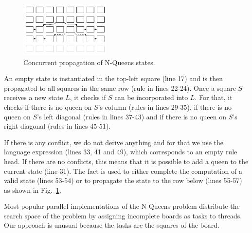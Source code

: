 \begin{figure}[ht]
\includegraphics[width=0.4\textwidth]{figures/coordination/nqueens.pdf}
\caption{Concurrent propagation of N-Queens states.}
\label{coordination:fig:nqueens}
\end{figure}

An empty state is instantiated in the top-left square (line 17) and is
then propagated to all squares in the same row (rule in lines
22-24). Once a square $S$ receives a new state $L$, it checks if $S$ can be
incorporated into $L$. For that, it checks if there is no queen on $S$'s
column (rules in lines 29-35), if there is no queen on $S$'s left
diagonal (rules in lines 37-43) and if there is no queen on $S$'s right
diagonal (rules in lines 45-51).

If there is any conflict, we do not derive anything and for that we use the
language expression  (lines 33, 41 and 49), which corresponds to an
empty rule head. If there are no conflicts, this means that it is possible to
add a queen to the current state (line 31). The fact  is
used to either complete the computation of a valid state (lines 53-54) or to
propagate the state to the row below (lines 55-57) as shown in
Fig.~\ref{coordination:fig:nqueens}.

Most popular parallel implementations of the N-Queens problem
distribute the search space of the problem by assigning incomplete
boards as tasks to threads. Our approach is unusual because the tasks
are the squares of the board.

